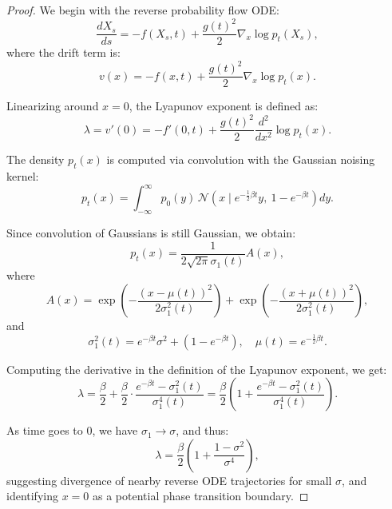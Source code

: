 \documentclass{article}
\theoremstyle{plain}
\theoremstyle{definition}
\theoremstyle{remark}
\begin{document}
\begin{proof}
    We begin with the reverse probability flow ODE:
\begin{equation}
\frac{dX_s}{ds} = -f(X_s,t) + \frac{g(t)^2}{2} \nabla_x \log p_t(X_s),
\end{equation}
where the drift term is:
\begin{equation}
v(x) = -f(x,t) + \frac{g(t)^2}{2} \nabla_x \log p_t(x).
\end{equation}

Linearizing around $x = 0$, the Lyapunov exponent is defined as:
\begin{equation}
\lambda = v'(0) = -f'(0,t) + \frac{g(t)^2}{2} \frac{d^2}{dx^2} \log p_t(x).
\end{equation}

The density $p_t(x)$ is computed via convolution with the Gaussian noising kernel:
\begin{equation}
p_t(x) = \int_{-\infty}^{\infty} p_0(y)\, \mathcal{N}\left(x \mid e^{-\frac{1}{2}\beta t}y,\ 1 - e^{-\beta t} \right)dy.
\end{equation}

Since convolution of Gaussians is still Gaussian, we obtain:
\begin{equation}
p_t(x) = \frac{1}{2\sqrt{2\pi}\sigma_1(t)} A(x),
\end{equation}
where
\begin{equation}
A(x) = \exp\left(-\frac{(x - \mu(t))^2}{2\sigma_1^2(t)}\right) + \exp\left(-\frac{(x + \mu(t))^2}{2\sigma_1^2(t)}\right),
\end{equation}
and
\begin{equation}
\sigma_1^2(t) = e^{-\beta t}\sigma^2 + (1 - e^{-\beta t}), \quad \mu(t) = e^{-\frac{1}{2} \beta t}.
\end{equation}

Computing the derivative in the definition of the Lyapunov exponent, we get:
\begin{equation}
\lambda = \frac{\beta}{2} + \frac{\beta}{2} \cdot \frac{e^{-\beta t} - \sigma_1^2(t)}{\sigma_1^4(t)} = \frac{\beta}{2} \left(1 + \frac{e^{-\beta t} - \sigma_1^2(t)}{\sigma_1^4(t)}\right).
\end{equation}

As time goes to $0$, we have $\sigma_1 \to \sigma$, and thus:
\begin{equation}
\lambda = \frac{\beta}{2} \left(1 + \frac{1 - \sigma^2}{\sigma^4} \right),
\end{equation}
suggesting divergence of nearby reverse ODE trajectories for small $\sigma$, and identifying $x = 0$ as a potential phase transition boundary.
\end{proof}
\end{document}
